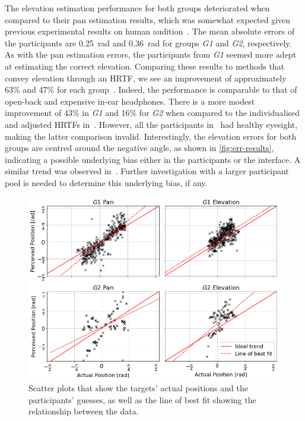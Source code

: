 \documentclass{llncs}
\begin{document}
The elevation estimation performance for both groups deteriorated when compared to their pan estimation results, which was somewhat expected given previous experimental results on human audition~\cite{barfield1997visual}. 
The mean absolute errors of the participants are \SI{0.25}{\radian} and \SI{0.36}{\radian} for groups \textit{G1} and \textit{G2}, respectively.
As with the pan estimation errors, the participants from \textit{G1} seemed more adept at estimating the correct elevation.
Comparing these results to methods that convey elevation through an HRTF, we see an improvement of approximately 63\% and 47\% for each group~\cite{schonstein2008comparison}. 
Indeed, the performance is comparable to that of open-back and expensive in-ear headphones.
There is a more modest improvement of 43\% in \textit{G1} and 16\% for \textit{G2} when compared to the individualised and adjusted HRTFs in~\cite{stanley2006lateralization}.
However, all the participants in~\cite{stanley2006lateralization} had healthy eyesight, making the latter comparison invalid. 
Interestingly, the elevation errors for both groups are centred around the negative angle, as shown in \cref{fig:err-results}, indicating a possible underlying bias either in the participants or the interface.
A similar trend was observed in~\cite{stanley2006lateralization}. Further investigation with a larger participant pool is needed to determine this underlying bias, if any. 

\begin{figure}
  \centering
  \includegraphics[width=1.0\columnwidth]{figures/correlation.png}
  \caption{Scatter plots that show the targets' actual positions and the participants' guesses, as well as the line of best fit showing the relationship between the data. }\label{fig:correlation-results}
\end{figure}
\end{document}
